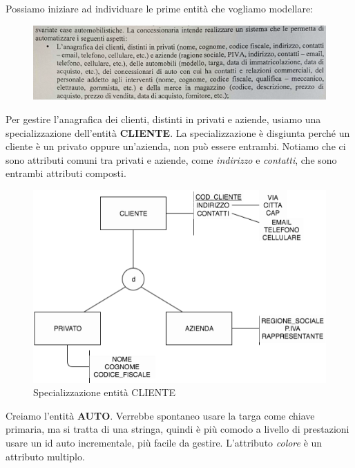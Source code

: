 Possiamo iniziare ad individuare le prime entità che vogliamo modellare:

\begin{center}
\begin{figure}[H]
\centering
\includegraphics[scale=0.8]{figures/101120162.png}
\end{figure}
\end{center}

Per gestire l’anagrafica dei clienti, distinti in privati e aziende, usiamo una specializzazione dell’entità \textbf{CLIENTE}. La specializzazione è disgiunta perché un cliente è un privato oppure un’azienda, non può essere entrambi. Notiamo che ci sono attributi comuni tra privati e aziende, come \textit{indirizzo} e \textit{contatti}, che sono entrambi attributi composti. 

\begin{center}
\begin{figure}[H]
\centering
\includegraphics[scale=1]{figures/cliente_spec.png}
\caption{Specializzazione entità CLIENTE}
\end{figure}
\end{center}

Creiamo l’entità \textbf{AUTO}. Verrebbe spontaneo usare la targa come chiave primaria, ma si tratta di una stringa, quindi è più comodo a livello di prestazioni usare un id auto incrementale, più facile da gestire. L’attributo \textit{colore} è un attributo multiplo.

